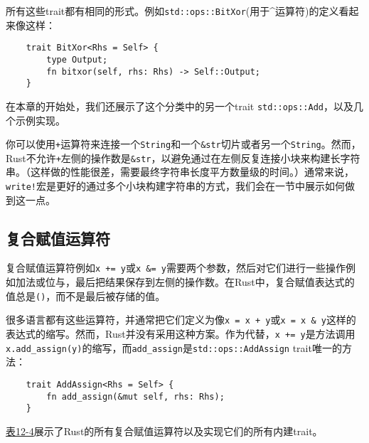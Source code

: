 所有这些trait都有相同的形式。例如\texttt{std::ops::BitXor}(用于\^{}运算符)的定义看起来像这样：
\begin{verbatim}
    trait BitXor<Rhs = Self> {
        type Output;
        fn bitxor(self, rhs: Rhs) -> Self::Output;
    }
\end{verbatim}

在本章的开始处，我们还展示了这个分类中的另一个trait \texttt{std::ops::Add}，以及几个示例实现。

你可以使用\texttt{+}运算符来连接一个\texttt{String}和一个\texttt{\&str}切片或者另一个\texttt{String}。然而，Rust不允许\texttt{+}左侧的操作数是\texttt{\&str}，以避免通过在左侧反复连接小块来构建长字符串。（这样做的性能很差，需要最终字符串长度平方数量级的时间。）通常来说，\texttt{write!}宏是更好的通过多个小块构建字符串的方式，我们会在一节中展示如何做到这一点。

\subsection{复合赋值运算符}\label{assign}
复合赋值运算符例如\texttt{x += y}或\texttt{x \&= y}需要两个参数，然后对它们进行一些操作例如加法或位与，最后把结果保存到左侧的操作数。在Rust中，复合赋值表达式的值总是\texttt{()}，而不是最后被存储的值。

很多语言都有这些运算符，并通常把它们定义为像\texttt{x = x + y}或\texttt{x = x \& y}这样的表达式的缩写。然而，Rust并没有采用这种方案。作为代替，\texttt{x += y}是方法调用\texttt{x.add\_assign(y)}的缩写，而\texttt{add\_assign}是\texttt{std::ops::AddAssign} trait唯一的方法：
\begin{verbatim}
    trait AddAssign<Rhs = Self> {
        fn add_assign(&mut self, rhs: Rhs);
    }
\end{verbatim}

\hyperref[t12-4]{表12-4}展示了Rust的所有复合赋值运算符以及实现它们的所有内建trait。

